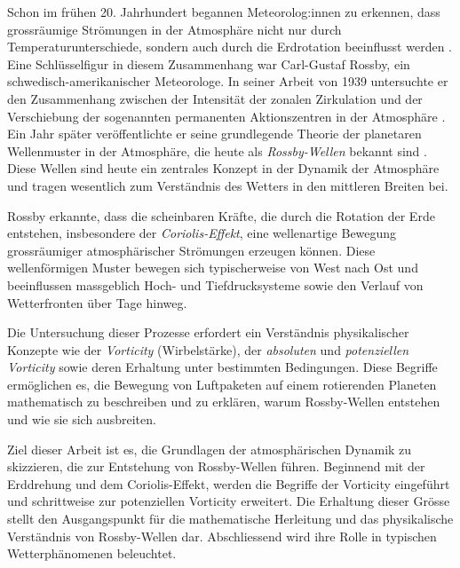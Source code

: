 

Schon im frühen 20. Jahrhundert begannen Meteorolog:innen zu erkennen, dass grossräumige Strömungen in der Atmosphäre nicht nur durch Temperaturunterschiede, sondern auch durch die Erdrotation beeinflusst werden \cite{rossby:https://doi.org/10.1002/wcc.95}.
%
Eine Schlüsselfigur in diesem Zusammenhang war Carl-Gustaf Rossby, ein schwedisch-amerikanischer Meteorologe.
%
In seiner Arbeit von 1939 untersuchte er den Zusammenhang zwischen der Intensität der zonalen Zirkulation und der Verschiebung der sogenannten permanenten Aktionszentren in der Atmosphäre \cite{rossby:1939relation}.
%
%
Ein Jahr später veröffentlichte er seine grundlegende Theorie der planetaren Wellenmuster in der Atmosphäre, die heute als \emph{Rossby-Wellen} bekannt sind \cite{rossby:1940planetary}.
%
%
Diese Wellen sind heute ein zentrales Konzept in der Dynamik der Atmosphäre und tragen wesentlich zum Verständnis des Wetters in den mittleren Breiten bei.
%

Rossby erkannte, dass die scheinbaren Kräfte, die durch die Rotation der Erde entstehen, insbesondere der \emph{Coriolis-Effekt}, eine wellenartige Bewegung grossräumiger atmosphärischer Strömungen erzeugen können.
%
Diese wellenförmigen Muster bewegen sich typischerweise von West nach Ost und beeinflussen massgeblich Hoch- und Tiefdrucksysteme sowie den Verlauf von Wetterfronten über Tage hinweg.
%
%
%

Die Untersuchung dieser Prozesse erfordert ein Verständnis physikalischer Konzepte wie der \emph{Vorticity} (Wirbelstärke), der \emph{absoluten} und \emph{potenziellen Vorticity} sowie deren Erhaltung unter bestimmten Bedingungen.
%
%
%
%
Diese Begriffe ermöglichen es, die Bewegung von Luftpaketen auf einem rotierenden Planeten mathematisch zu beschreiben und zu erklären, warum Rossby-Wellen entstehen und wie sie sich ausbreiten.

Ziel dieser Arbeit ist es, die Grundlagen der atmosphärischen Dynamik zu skizzieren, die zur Entstehung von Rossby-Wellen führen.
Beginnend mit der Erddrehung und dem Coriolis-Effekt, werden die Begriffe der Vorticity eingeführt und schrittweise zur potenziellen Vorticity erweitert.
Die Erhaltung dieser Grösse stellt den Ausgangspunkt für die mathematische Herleitung und das physikalische Verständnis von Rossby-Wellen dar.
Abschliessend wird ihre Rolle in typischen Wetterphänomenen beleuchtet.


